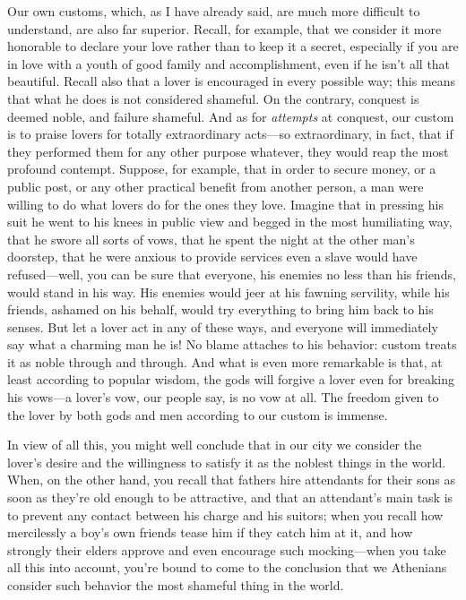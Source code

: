 Our own customs, which, as I have already said, are much more difficult
to understand, are also far superior. Recall, for example, that we
consider it more honorable to declare your love rather than to keep it a
secret, especially if you are in love with a youth of good family and
accomplishment, even if he isn't all that beautiful. Recall also that a
lover is encouraged in every possible way; this means that what he does
is not considered shameful. On the contrary, conquest is deemed noble,
and failure shameful.  And as for {\em attempts} at conquest, our
custom is to praise lovers for totally extraordinary acts---so
extraordinary, in fact, that if they performed them  for
any other purpose whatever, they would reap the most profound contempt.
Suppose, for example, that in order to secure money, or a public post,
or any other practical benefit from another person, a man were willing
to do what lovers do for the ones they love. Imagine that in pressing
his suit he went to his knees in public view and begged in the most
humiliating way, that he swore all sorts of vows, that he spent the
night at the other man's doorstep, that he were anxious to provide
services even a slave would have refused---well, you can be sure that
everyone, his enemies no less than his friends, would stand in his way.
His enemies would jeer at  his fawning servility, while his
friends, ashamed on his behalf, would try everything to bring him back
to his senses. But let a lover act in any of these ways, and everyone
will immediately say what a charming man he is! No blame attaches to his
behavior: custom treats it as noble through and through. And what is
even more remarkable is that, at least according to popular wisdom, the
gods will forgive a lover even for breaking his vows---a lover's vow,
our people say, is no vow at all. The freedom given  to the lover
by both gods and men according to our custom is immense.

In view of all this, you might well conclude that in our city we
consider the lover's desire and the willingness to satisfy it as the
noblest things in the world. When, on the other hand, you recall that
fathers hire attendants for their sons as soon as they're old enough to
be attractive, and that an attendant's main task is to prevent any
contact between his charge and his suitors; when you recall how
mercilessly a boy's own friends tease him if they catch him at it, and
how strongly their elders approve and  even encourage such
mocking---when you take all this into account, you're bound to come to
the conclusion that we Athenians consider such behavior the most
shameful thing in the world.

